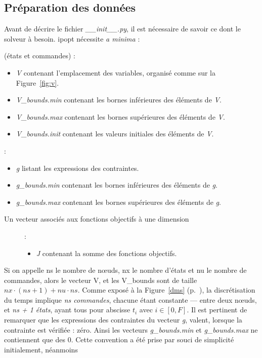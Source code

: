             \subsection{Préparation des données}

Avant de décrire le fichier \emph{\_\_init\_\_.py}, il est nécessaire de savoir ce dont le solveur à besoin. \gls{ipopt} nécessite \emph{a minima} :
\begin{description}
\setlength\itemsep{-0.5em}
\item[Quatre vecteurs associés aux variables] (états et commandes) :
\begin{itemize}
\item \emph{V} contenant l'emplacement des variables, organisé comme sur la Figure~\ref{fig:v}.
\item \emph{V\_bounds.min} contenant les bornes inférieures des éléments de \emph{V}.
\item \emph{V\_bounds.max} contenant les bornes supérieures des éléments de \emph{V}.
\item \emph{V\_bounds.init} contenant les valeurs initiales des éléments de \emph{V}.
\end{itemize}
\end{description}


\begin{description}
\setlength\itemsep{-0.5em}
\item[Trois vecteurs associés aux contraintes] :
\begin{itemize}
\item \emph{g} listant les expressions des contraintes.
\item \emph{g\_bounds.min} contenant les bornes inférieures des éléments de \emph{g}.
\item \emph{g\_bounds.max} contenant les bornes supérieures des éléments de \emph{g}.
\end{itemize}
\end{description}


\begin{description}
\item[Un vecteur associés aux fonctions objectifs à une dimension] :
\begin{itemize}
\item \emph{J} contenant la somme des fonctions objectifs.
\end{itemize}
\end{description}

Si on appelle ns le nombre de nœuds, nx le nombre d'états et nu le nombre de commandes, alors le vecteur V, et les V\_bounds sont de taille $nx \cdot (ns + 1) + nu \cdot ns$. Comme exposé à la Figure~\ref{dms} (p.~\pageref{dms}), la discrétisation du temps implique \emph{ns commandes}, chacune étant constante --- entre deux nœuds, et \emph{ns + 1 états}, ayant tous pour abscisse $t_{i}$ avec $i\in[0, F]$. 
Il est pertinent de remarquer que les expressions des contraintes du vecteur \emph{g}, valent, lorsque la contrainte est vérifiée : zéro. Ainsi les vecteurs \emph{g\_bounds.min} et \emph{g\_bounds.max} ne contiennent que des 0. Cette convention a été prise par souci de simplicité initialement, néanmoins 

